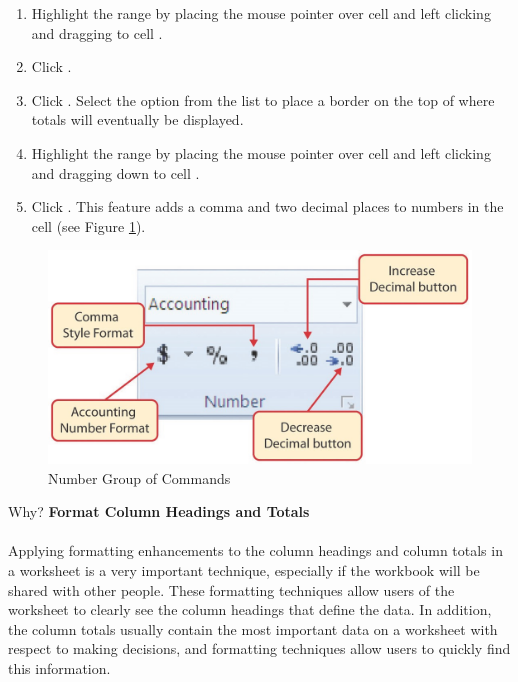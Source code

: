\begin{enumbox}
	\begin{enumerate}
		\item Highlight the range  by placing the mouse pointer over cell  and left clicking and dragging to cell .
		\item Click .
		\item Click . Select the  option from the list to place a border on the top of  where totals will eventually be displayed.
		\item Highlight the range  by placing the mouse pointer over cell  and left clicking and dragging down to cell .
		\item Click . This feature adds a comma and two decimal places to numbers in the cell (see Figure \ref{01:fig35}).
	\end{enumerate}
\end{enumbox}

\begin{figure}[H]
	\centering
	\includegraphics[width=\maxwidth{.95\linewidth}]{gfx/ch01_fig35}
	\caption{Number Group of Commands}
	\label{01:fig35}
\end{figure}

\begin{center}
	\begin{infobox}{Why?}
		\textbf{Format Column Headings and Totals}
		\\
		\\
		Applying formatting enhancements to the column headings and column totals in a worksheet is a very important technique, especially if the workbook will be shared with other people. These formatting techniques allow users of the worksheet to clearly see the column headings that define the data. In addition, the column totals usually contain the most important data on a worksheet with respect to making decisions, and formatting techniques allow users to quickly find this information.
	\end{infobox}
\end{center}

